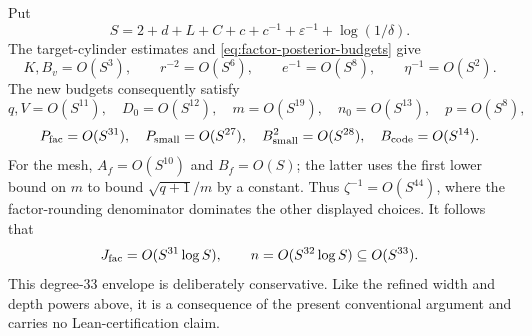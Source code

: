 \begin{remark}
\label{rem:factor-joint-polynomial}
Put
\[
 S=2+d+L+C+c+c^{-1}+\varepsilon^{-1}+\log(1/\delta).
\]
The target-cylinder estimates and
\eqref{eq:factor-posterior-budgets} give
\[
 K,B_v=O(S^3),\qquad r^{-2}=O(S^6),\qquad
 e^{-1}=O(S^8),\qquad \eta^{-1}=O(S^2).
\]
The new budgets consequently satisfy
\[
 q,V=O(S^{11}),\quad D_0=O(S^{12}),\quad
 m=O(S^{19}),\quad n_0=O(S^{13}),\quad p=O(S^8),
\]
\[
 P_{\rm fac}=O(S^{31}),\quad P_{\rm small}=O(S^{27}),\quad
 B_{\rm small}^2=O(S^{28}),\quad B_{\rm code}=O(S^{14}).
\]
For the mesh, $A_f=O(S^{10})$ and $B_f=O(S)$; the latter uses the
first lower bound on $m$ to bound $\sqrt{q+1}/m$ by a constant.
Thus $\zeta^{-1}=O(S^{44})$, where the factor-rounding denominator
dominates the other displayed choices. It follows that
\[
 J_{\rm fac}=O(S^{31}\log S),\qquad
 n=O(S^{32}\log S)\subseteq O(S^{33}).
\]
This degree-33 envelope is deliberately conservative. Like the refined
width and depth powers above, it is a consequence of the present
conventional argument and carries no Lean-certification claim.
\end{remark}
